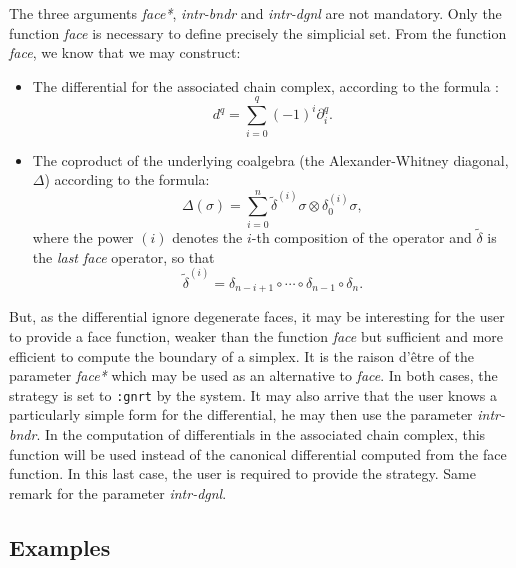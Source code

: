 The three arguments {\em face*},  {\em intr-bndr} and {\em intr-dgnl} are not mandatory.
Only the function {\em face} is necessary to define precisely the simplicial set.
From the function {\em face}, we know that we may construct:
\begin{itemize}
\item The differential for the associated chain complex,
according to the formula :
$$d^q = \sum_{i=0}^q { (-1)^i \partial_i^q}.$$
\item The coproduct of the underlying coalgebra (the Alexander-Whitney diagonal, $\Delta$) according to the
formula:
$$\Delta(\sigma)= \sum_{i=0}^{n}{{\tilde{\delta}}^{(i)}\sigma \otimes \delta_0^{(i)} \sigma},$$
where the power $(i)$ denotes the $i$-th composition of the operator and $\tilde{\delta}$ is the
{\em last face} operator, so that $${\tilde{\delta}}^{(i)}=\delta_{n-i+1}\circ \cdots \circ \delta_{n-1}\circ \delta_n.$$
\end{itemize}
But, as the differential ignore degenerate faces, it may be interesting for the user to provide a face function,
weaker than the function {\em face} but sufficient and more efficient to compute the boundary of a
simplex. It is the raison d'\^etre of the parameter {\em face*} which may be used as an alternative to {\em face}.
In both cases, the strategy is set to {\tt :gnrt} by the system. It may also arrive that the user knows
a particularly simple form for the differential, he may then use the parameter {\em intr-bndr}. In the computation
of differentials in the associated chain complex, this function will be used instead of the
canonical differential computed from the face function. In this last case, the user is required to provide
the strategy. Same remark for the parameter {\em intr-dgnl}.

\subsection* {Examples}


